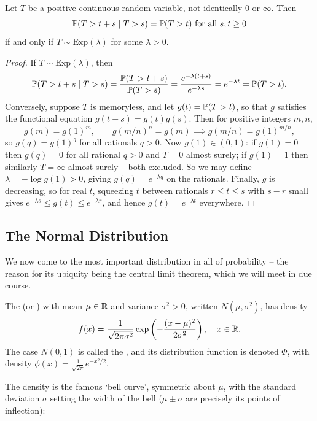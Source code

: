\documentclass[a4paper]{scrartcl}
\begin{document}
\begin{theorem}[Memorylessness]
	Let $T$ be a positive continuous random variable, not identically $0$ or $\infty$. Then
	$$
	\mathbb{P}(T > t + s \mid T > s) = \mathbb{P}(T > t) \text{ for all } s, t \geq 0
	$$
	if and only if $T \sim \mathrm{Exp}(\lambda)$ for some $\lambda > 0$.
\end{theorem}
\begin{proof}
	If $T \sim \mathrm{Exp}(\lambda)$, then
	$$
	\mathbb{P}(T > t + s \mid T > s) = \frac{\mathbb{P}(T > t + s)}{\mathbb{P}(T > s)} = \frac{e^{-\lambda(t + s)}}{e^{-\lambda s}} = e^{-\lambda t} = \mathbb{P}(T > t).
	$$
	Conversely, suppose $T$ is memoryless, and let $g(t) = \mathbb{P}(T > t)$, so that $g$ satisfies the functional equation $g(t + s) = g(t)g(s)$. Then for positive integers $m, n$,
	$$
	g(m) = g(1)^m, \qquad g(m/n)^n = g(m) \implies g(m/n) = g(1)^{m/n},
	$$
	so $g(q) = g(1)^q$ for all rationals $q > 0$. Now $g(1) \in (0, 1)$: if $g(1) = 0$ then $g(q) = 0$ for all rational $q > 0$ and $T = 0$ almost surely; if $g(1) = 1$ then similarly $T = \infty$ almost surely -- both excluded. So we may define $\lambda = -\log g(1) > 0$, giving $g(q) = e^{-\lambda q}$ on the rationals. Finally, $g$ is decreasing, so for real $t$, squeezing $t$ between rationals $r \leq t \leq s$ with $s - r$ small gives $e^{-\lambda s} \leq g(t) \leq e^{-\lambda r}$, and hence $g(t) = e^{-\lambda t}$ everywhere.
\end{proof}

\subsection{The Normal Distribution}

We now come to the most important distribution in all of probability -- the reason for its ubiquity being the central limit theorem, which we will meet in due course.

\begin{definition}
	The  (or )  with mean $\mu \in \mathbb{R}$ and variance $\sigma^2 > 0$, written $N(\mu, \sigma^2)$, has density
	$$
	f(x) = \frac{1}{\sqrt{2\pi \sigma^2}} \exp\left(-\frac{(x - \mu)^2}{2\sigma^2}\right), \quad x \in \mathbb{R}.
	$$
	The case $N(0, 1)$ is called the , and its distribution function is denoted $\Phi$, with density $\phi(x) = \frac{1}{\sqrt{2\pi}}e^{-x^2/2}$.
\end{definition}

The density is the famous `bell curve', symmetric about $\mu$, with the standard deviation $\sigma$ setting the width of the bell ($\mu \pm \sigma$ are precisely its points of inflection):
\end{document}
